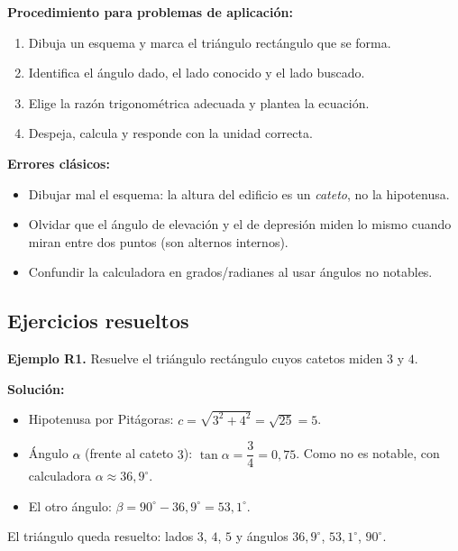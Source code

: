 \documentclass[12pt, letterpaper]{article}
\begin{document}
\begin{cuadropasos}
  \textbf{Procedimiento para problemas de aplicación:}
  \begin{enumerate}[leftmargin=*]
    \item Dibuja un esquema y marca el triángulo rectángulo que se forma.
    \item Identifica el ángulo dado, el lado conocido y el lado buscado.
    \item Elige la razón trigonométrica adecuada y plantea la ecuación.
    \item Despeja, calcula y responde con la unidad correcta.
  \end{enumerate}
\end{cuadropasos}
\newpage
\begin{cuadroadvertencia}
  \textbf{Errores clásicos:}
  \begin{itemize}[leftmargin=*]
    \item Dibujar mal el esquema: la altura del edificio es un \emph{cateto}, no la hipotenusa.
    \item Olvidar que el ángulo de elevación y el de depresión miden lo mismo cuando miran entre dos puntos (son alternos internos).
    \item Confundir la calculadora en grados/radianes al usar ángulos no notables.
  \end{itemize}
\end{cuadroadvertencia}

\subsection{Ejercicios resueltos}

\textbf{Ejemplo R1.} Resuelve el triángulo rectángulo cuyos catetos miden $3$ y $4$.

\begin{cuadrosolucion}
  \textbf{Solución:}
  \begin{itemize}
    \item Hipotenusa por Pitágoras: $c = \sqrt{3^2 + 4^2} = \sqrt{25} = 5$.
    \item Ángulo $\alpha$ (frente al cateto $3$): $\tan \alpha = \dfrac{3}{4} = 0{,}75$. Como no es notable, con calculadora $\alpha \approx 36{,}9^{\circ}$.
    \item El otro ángulo: $\beta = 90^{\circ} - 36{,}9^{\circ} = 53{,}1^{\circ}$.
  \end{itemize}
  El triángulo queda resuelto: lados $3$, $4$, $5$ y ángulos $36{,}9^{\circ}$, $53{,}1^{\circ}$, $90^{\circ}$.
\end{cuadrosolucion}
\end{document}
